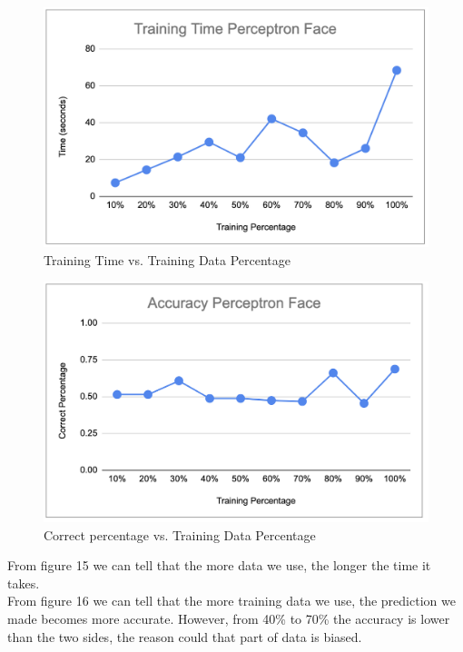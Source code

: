 \documentclass[11pt]{report}
\begin{document}
\begin{figure}[h]
\begin{center}
\includegraphics[scale=0.5]{Perceptron_face_traintime.png} 
\end{center}
\caption{Training Time vs. Training Data Percentage}
\end{figure}
\newpage
\begin{figure}[t]
\begin{center}
\includegraphics[scale=0.5]{Perceptron_face_accuracy.png} 
\end{center}
\caption{Correct percentage vs. Training Data Percentage}
\end{figure}

From figure 15 we can tell that the more data we use, the longer the time it takes.\\

From figure 16 we can tell that the more training data we use, the prediction we made becomes more accurate. However, from 40\% to 70\% the accuracy is lower than the two sides, the reason could that part of data is biased.
\end{document}
